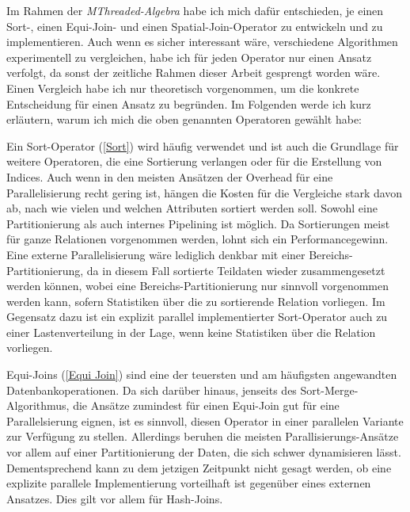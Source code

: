 \documentclass[a4paper,12pt,twoside]{article}
\newcommand{\Fb}[1]{\textit{#1}} %
\begin{document}
Im Rahmen der \Fb{MThreaded-Algebra} habe ich mich dafür entschieden, je einen Sort-, einen Equi-Join- und einen Spatial-Join-Operator zu entwickeln und zu implementieren. Auch wenn es sicher interessant wäre, verschiedene Algorithmen experimentell zu vergleichen, habe ich für jeden Operator nur einen Ansatz verfolgt, da sonst der zeitliche Rahmen dieser Arbeit gesprengt worden wäre. Einen Vergleich habe ich nur theoretisch vorgenommen, um die konkrete Entscheidung für einen Ansatz zu begründen. Im Folgenden werde ich kurz erläutern, warum ich mich die oben genannten Operatoren gewählt habe:

Ein Sort-Operator (\autoref{Sort}) wird häufig verwendet und ist auch die Grundlage für weitere Operatoren, die eine Sortierung verlangen oder für die Erstellung von Indices. Auch wenn in den meisten Ansätzen der Overhead für eine Parallelisierung recht gering ist, hängen die Kosten für die Vergleiche stark davon ab, nach wie vielen und welchen Attributen sortiert werden soll. Sowohl eine Partitionierung als auch internes Pipelining ist möglich. Da Sortierungen meist für ganze Relationen vorgenommen werden, lohnt sich ein Performancegewinn. Eine externe Parallelisierung wäre lediglich denkbar mit einer Bereichs-Partitionierung, da in diesem Fall sortierte Teildaten wieder zusammengesetzt werden können, wobei eine Bereichs-Partitionierung nur sinnvoll vorgenommen werden kann, sofern Statistiken über die zu sortierende Relation vorliegen. Im Gegensatz dazu ist ein explizit parallel implementierter Sort-Operator auch zu einer Lastenverteilung in der Lage, wenn keine Statistiken über die Relation vorliegen.

Equi-Joins (\autoref{Equi Join}) sind eine der teuersten und am häufigsten angewandten Datenbankoperationen. Da sich darüber hinaus, jenseits des Sort-Merge-Algorithmus, die Ansätze zumindest für einen Equi-Join gut für eine Parallelsierung eignen, ist es sinnvoll, diesen Operator in einer parallelen Variante zur Verfügung zu stellen. Allerdings beruhen die meisten Parallisierungs-Ansätze vor allem auf einer Partitionierung der Daten, die sich schwer dynamisieren lässt. Dementsprechend kann zu dem jetzigen Zeitpunkt nicht gesagt werden, ob eine explizite parallele Implementierung vorteilhaft ist gegenüber eines externen Ansatzes. Dies gilt vor allem für Hash-Joins.
\end{document}
